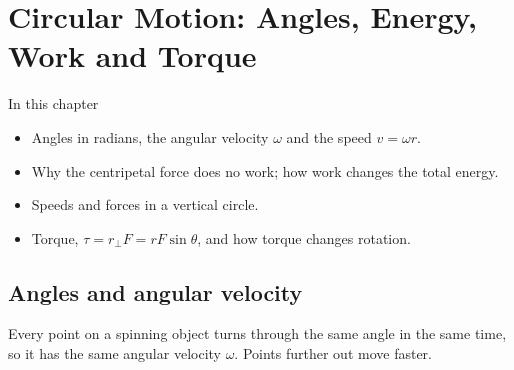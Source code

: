 \chapter{Circular Motion: Angles, Energy, Work and Torque}\label{ch3:chap}

\begin{summarybox}{In this chapter}
\begin{itemize}
  \item Angles in radians, the angular velocity $\omega$ and the speed $v = \omega r$.
  \item Why the centripetal force does no work; how work changes the total energy.
  \item Speeds and forces in a vertical circle.
  \item Torque, $\tau = r_\perp F = rF\sin\theta$, and how torque changes rotation.
\end{itemize}
\end{summarybox}

\section{Angles and angular velocity}\label{ch3:sec:omega}

\begin{bigidea}
Every point on a spinning object turns through the same angle in the same time, so it has
the same angular velocity $\omega$. Points further out move faster.
\end{bigidea}

\begin{keywords}
\end{keywords}


